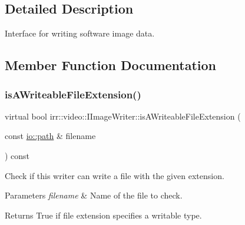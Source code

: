 \subsection{Detailed Description}
Interface for writing software image data. 

\subsection{Member Function Documentation}
\mbox{\label{classirr_1_1video_1_1IImageWriter_a776f8a7a050572f2144848a86fe6de6b}} 
\subsubsection{\texorpdfstring{is\+A\+Writeable\+File\+Extension()}{isAWriteableFileExtension()}\hspace{0.1cm}{\footnotesize\ttfamily [1/2]}}
{\footnotesize\ttfamily virtual bool irr\+::video\+::\+I\+Image\+Writer\+::is\+A\+Writeable\+File\+Extension (\begin{DoxyParamCaption}\item[{const \hyperlink{namespaceirr_1_1io_a6468281622ce3a1c46b72e19f32dded5}{io\+::path} \&}]{filename }\end{DoxyParamCaption}) const\hspace{0.3cm}{\ttfamily [pure virtual]}}



Check if this writer can write a file with the given extension. 


\begin{DoxyParams}{Parameters}
{\em filename} & Name of the file to check. \\
\hline
\end{DoxyParams}
\begin{DoxyReturn}{Returns}
True if file extension specifies a writable type. 
\end{DoxyReturn}
\mbox{\label{classirr_1_1video_1_1IImageWriter_a776f8a7a050572f2144848a86fe6de6b}} 
